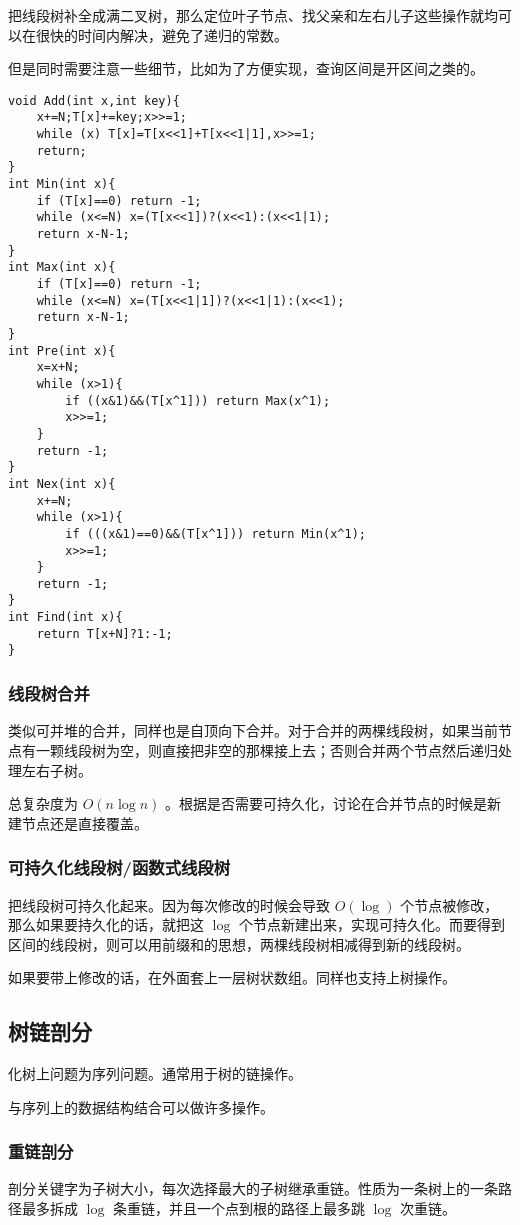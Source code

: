 \documentclass[UTF-8]{ctexart}
\begin{document}
	把线段树补全成满二叉树，那么定位叶子节点、找父亲和左右儿子这些操作就均可以在很快的时间内解决，避免了递归的常数。
	
	但是同时需要注意一些细节，比如为了方便实现，查询区间是开区间之类的。
\begin{verbatim}
void Add(int x,int key){
    x+=N;T[x]+=key;x>>=1;
    while (x) T[x]=T[x<<1]+T[x<<1|1],x>>=1;
    return;
}
int Min(int x){
    if (T[x]==0) return -1;
    while (x<=N) x=(T[x<<1])?(x<<1):(x<<1|1);
    return x-N-1;
}
int Max(int x){
    if (T[x]==0) return -1;
    while (x<=N) x=(T[x<<1|1])?(x<<1|1):(x<<1);
    return x-N-1;
}
int Pre(int x){
    x=x+N;
    while (x>1){
        if ((x&1)&&(T[x^1])) return Max(x^1);
        x>>=1;
    }
    return -1;
}
int Nex(int x){
    x+=N;
    while (x>1){
        if (((x&1)==0)&&(T[x^1])) return Min(x^1);
        x>>=1;
    }
    return -1;
}
int Find(int x){
    return T[x+N]?1:-1;
}
\end{verbatim}
	\subsubsection{线段树合并}
	类似可并堆的合并，同样也是自顶向下合并。对于合并的两棵线段树，如果当前节点有一颗线段树为空，则直接把非空的那棵接上去；否则合并两个节点然后递归处理左右子树。
	
	总复杂度为 $O(n \log n)$ 。根据是否需要可持久化，讨论在合并节点的时候是新建节点还是直接覆盖。
	\subsubsection{可持久化线段树/函数式线段树}
	把线段树可持久化起来。因为每次修改的时候会导致 $O(\log)$ 个节点被修改，那么如果要持久化的话，就把这 $\log$ 个节点新建出来，实现可持久化。而要得到区间的线段树，则可以用前缀和的思想，两棵线段树相减得到新的线段树。
	
	如果要带上修改的话，在外面套上一层树状数组。同样也支持上树操作。
	\subsection{树链剖分}
	化树上问题为序列问题。通常用于树的链操作。
	
	与序列上的数据结构结合可以做许多操作。
	
	\subsubsection{重链剖分}
	剖分关键字为子树大小，每次选择最大的子树继承重链。性质为一条树上的一条路径最多拆成 $\log$ 条重链，并且一个点到根的路径上最多跳 $\log$ 次重链。
	
\end{document}
